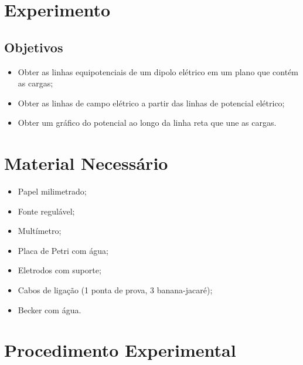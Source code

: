 \section{Experimento}

\subsection{Objetivos}
\label{Sec:ObjetivosSupEquip}

\begin{itemize}
	\item Obter as linhas equipotenciais de um dipolo elétrico em um plano que contém as cargas;
	\item Obter as linhas de campo elétrico a partir das linhas de potencial elétrico;
	\item Obter um gráfico do potencial ao longo da linha reta que une as cargas.
\end{itemize}

\section{Material Necessário}

\begin{itemize}
	\item Papel milimetrado;
	\item Fonte regulável;
	\item Multímetro;
	\item Placa de Petri com água;
	\item Eletrodos com suporte;
	\item Cabos de ligação (1 ponta de prova, 3 banana-jacaré);
	\item Becker com água.
\end{itemize}

\section{Procedimento Experimental}


